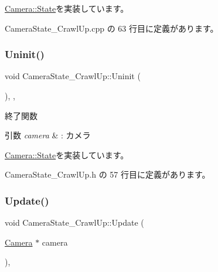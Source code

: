 \mbox{\hyperlink{class_camera_1_1_state_aa1b81471ab15e64b3117ffe7de9560ff}{Camera\+::\+State}}を実装しています。



 Camera\+State\+\_\+\+Crawl\+Up.\+cpp の 63 行目に定義があります。

\mbox{\label{class_camera_state___crawl_up_a046ec18a91e31b210ae000133fa6113a}} 
\subsubsection{\texorpdfstring{Uninit()}{Uninit()}}
{\footnotesize\ttfamily void Camera\+State\+\_\+\+Crawl\+Up\+::\+Uninit (\begin{DoxyParamCaption}{ }\end{DoxyParamCaption})\hspace{0.3cm}{\ttfamily [inline]}, {\ttfamily [override]}, {\ttfamily [virtual]}}



終了関数 


\begin{DoxyParams}{引数}
{\em camera} & \+: カメラ \\
\hline
\end{DoxyParams}


\mbox{\hyperlink{class_camera_1_1_state_adb3f43b6c3f8100da7877867180e804b}{Camera\+::\+State}}を実装しています。



 Camera\+State\+\_\+\+Crawl\+Up.\+h の 57 行目に定義があります。

\mbox{\label{class_camera_state___crawl_up_aaebd2634f1677b7c00e6761ed91e1264}} 
\subsubsection{\texorpdfstring{Update()}{Update()}}
{\footnotesize\ttfamily void Camera\+State\+\_\+\+Crawl\+Up\+::\+Update (\begin{DoxyParamCaption}\item[{\mbox{\hyperlink{class_camera}{Camera}} $\ast$}]{camera }\end{DoxyParamCaption})\hspace{0.3cm}{\ttfamily [override]}, {\ttfamily [virtual]}}



